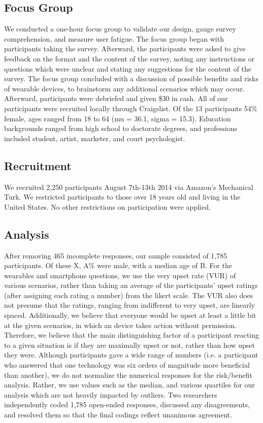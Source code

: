 \documentclass{acm_proc_article-sp}
\begin{document}
\subsection{Focus Group}
We conducted a one-hour focus group to validate our design, gauge survey comprehension, and measure user fatigue. The focus group began with participants taking the survey. Afterward, the participants were asked to give feedback on the format and the content of the survey, noting any instructions or questions which were unclear and stating any suggestions for the content of the survey. The focus group concluded with a discussion of possible benefits and risks of wearable devices, to brainstorm any additional scenarios which may occur. Afterward, participants were debriefed and given \$30 in cash. All of our participants were recruited locally through Craigslist. Of the 13 participants 54\% female, ages ranged from 18 to 64 (mu = 36.1, sigma = 15.3).  Education backgrounds ranged from high school to doctorate degrees, and professions included student, artist, marketer, and court psychologist.

\subsection{Recruitment}
We recruited 2,250 participants August 7th-13th 2014 via Amazon's Mechanical Turk. We restricted participants to those over 18 years old and living in the United States. No other restrictions on participation were applied. 

\subsection{Analysis}
After removing 465 incomplete responses, our sample consisted of 1,785 participants. Of these X, A\% were male, with a median age of B. For the wearables and smartphone questions, we use the very upset rate (VUR) of various scenarios, rather than taking an average of the participants' upset ratings (after assigning each rating a number) from the likert scale. The VUR also does not presume that the ratings, ranging from indifferent to very upset, are linearly spaced. Additionally, we believe that everyone would be upset at least a little bit at the given scenarios, in which an device takes action without permission. Therefore, we believe that the main distinguishing factor of a participant reacting to a given situation is if they are maximally upset or not, rather than how upset they were. Although participants gave a wide range of numbers (i.e. a participant who answered that one technology was six orders of magnitude more beneficial than another), we do not normalize the numerical responses for the risk/benefit analysis. Rather, we use values such as the median, and various quartiles for our analysis which are not heavily impacted by outliers. Two researchers independently coded 1,785 open-ended responses, discussed any disagreements, and resolved them so that the final codings reflect unanimous agreement.
\end{document}

